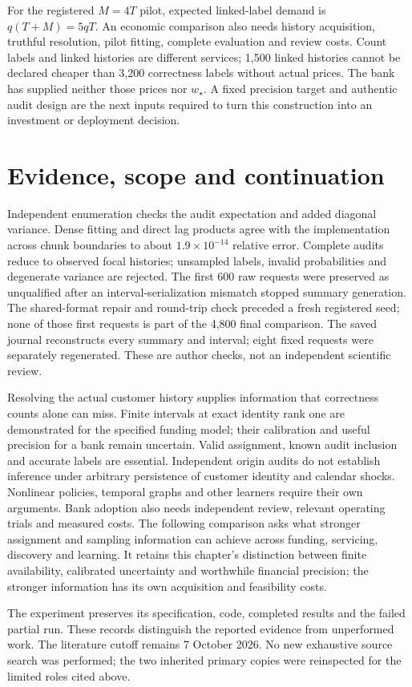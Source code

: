 For the registered $M=4T$ pilot, expected linked-label demand is $q(T+M)=5qT$.
An economic comparison also needs history acquisition, truthful resolution,
pilot fitting, complete evaluation and review costs. Count labels and linked
histories are different services; 1,500 linked histories cannot be declared
cheaper than 3,200 correctness labels without actual prices. The bank has
supplied neither those prices nor $w_\star$. A fixed precision target and
authentic audit design are the next inputs required to turn this construction
into an investment or deployment decision.

\section*{Evidence, scope and continuation}

Independent enumeration checks the audit expectation and added diagonal
variance. Dense fitting and direct lag products agree with the implementation
across chunk boundaries to about $1.9\times10^{-14}$ relative error. Complete
audits reduce to observed focal histories; unsampled labels, invalid
probabilities and degenerate variance are rejected. The first 600 raw requests
were preserved as unqualified after an interval-serialization mismatch stopped
summary generation. The shared-format repair and round-trip check preceded a
fresh registered seed; none of those first requests is part of the 4,800 final
comparison. The saved journal reconstructs every summary and interval; eight
fixed requests were separately regenerated. These are author checks, not an
independent scientific review.

Resolving the actual customer history supplies information that
correctness counts alone can miss. Finite intervals at exact identity rank
one are demonstrated for the specified funding model; their calibration and
useful precision for a bank remain uncertain. Valid assignment, known audit
inclusion and accurate labels are essential. Independent origin audits do
not establish inference under arbitrary persistence of customer identity and
calendar shocks. Nonlinear policies, temporal graphs and other learners
require their own arguments. Bank adoption also needs independent review,
relevant operating trials and measured costs. The following comparison asks what stronger assignment and sampling information can achieve across funding, servicing, discovery and learning. It retains this chapter's distinction between finite availability, calibrated uncertainty and worthwhile financial precision; the stronger information has its own acquisition and feasibility costs.

The experiment preserves its specification, code, completed results
and the failed partial run. These records distinguish the reported evidence
from unperformed work. The literature cutoff remains 7 October 2026. No new exhaustive source search
was performed; the two inherited primary copies were reinspected for the
limited roles cited above.

